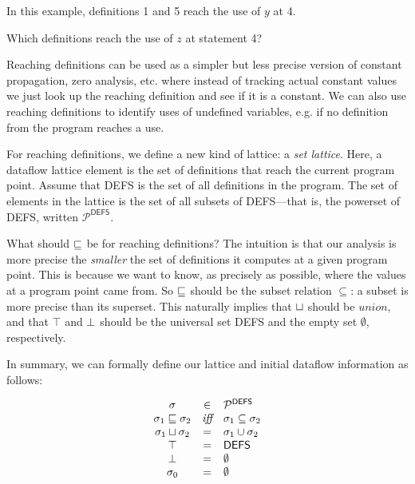 \documentclass[11pt]{article}
\begin{document}
\noindent In this example, definitions 1 and 5 reach the use of $y$ at 4.  

 Which definitions reach the use of $z$ at statement 4?


Reaching definitions can be used as a simpler but less precise version of constant propagation, zero analysis, etc. where instead of tracking actual constant values we just look up the reaching definition and see if it is a constant.  We can also use reaching definitions to identify uses of undefined variables, e.g. if no definition from the program reaches a use.

For reaching definitions, we define a new kind of lattice: a \textit{set lattice}.  Here, a dataflow lattice element is the set of definitions that reach the current program point.  Assume that \textsf{DEFS} is the set of all definitions in the program.  The set of elements in the lattice is the set of all subsets of \textsf{DEFS}---that is, the powerset of \textsf{DEFS}, written $\mathcal{P}^{\textsf{DEFS}}$.  

What should $\sqsubseteq$ be for reaching definitions?  The intuition is that our analysis is more precise the \textit{smaller} the set of definitions it computes at a given program point.  This is because we want to know, as precisely as possible, where the values at a program point came from.  So $\sqsubseteq$ should be the subset relation $\subseteq$: a subset is more precise than its superset.  This naturally implies that $\sqcup$ should be $union$, and that $\top$ and $\bot$ should be the universal set \textsf{DEFS} and the empty set $\emptyset$, respectively.

In summary, we can formally define our lattice and initial dataflow information as follows:

\[
\begin{array}{ccl}

\sigma & \in & \mathcal{P}^{\textsf{DEFS}}\\
\sigma_1 \sqsubseteq \sigma_2 & \textit{iff} & \sigma_1 \subseteq \sigma_2\\
\sigma_1 \sqcup \sigma_2 & = & \sigma_1 \cup \sigma_2\\
\top & = & \textsf{DEFS}\\
\bot & = & \emptyset\\
\sigma_0 & = & \emptyset\\

\end{array}
\]
\end{document}
